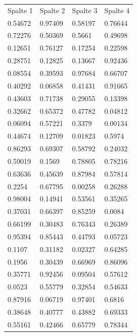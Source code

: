 \documentclass[12pt,ngerman,parskip=half]{scrreport}
\begin{document}
\begin{tabular}{llll}
Spalte 1	&	Spalte 2	&	Spalte 3	&	Spalte 4	\\
0.54672	&	0.97409	&	0.58197	&	0.76644	\\
0.72276	&	0.50369	&	0.5661	&	0.49698	\\
0.12651	&	0.76127	&	0.17254	&	0.22598	\\
0.28751	&	0.12825	&	0.13667	&	0.92436	\\
0.08554	&	0.39593	&	0.97684	&	0.66707	\\
0.40292	&	0.06858	&	0.41431	&	0.91665	\\
0.43603	&	0.71738	&	0.29055	&	0.13398	\\
0.32662	&	0.65372	&	0.47782	&	0.04812	\\
0.06094	&	0.57221	&	0.3379	&	0.00134	\\
0.44674	&	0.12709	&	0.01823	&	0.5974	\\
0.86293	&	0.69307	&	0.58792	&	0.24032	\\
0.59019	&	0.1569	&	0.78805	&	0.78216	\\
0.63636	&	0.45639	&	0.87984	&	0.57814	\\
0.2254	&	0.67795	&	0.00258	&	0.26288	\\
0.98004	&	0.14941	&	0.53561	&	0.35265	\\
0.37031	&	0.66397	&	0.85259	&	0.0084	\\
0.66199	&	0.30483	&	0.76343	&	0.26389	\\
0.95394	&	0.85443	&	0.44793	&	0.05723	\\
0.1107	&	0.31182	&	0.02327	&	0.64285	\\
0.1956	&	0.30439	&	0.66969	&	0.86096	\\
0.35771	&	0.92456	&	0.09504	&	0.57612	\\
0.0523	&	0.55779	&	0.32854	&	0.54633	\\
0.87916	&	0.06719	&	0.97401	&	0.6816	\\
0.38648	&	0.40777	&	0.43882	&	0.69333	\\
0.55161	&	0.42466	&	0.65779	&	0.78344	\\
\end{tabular}
\end{document}
